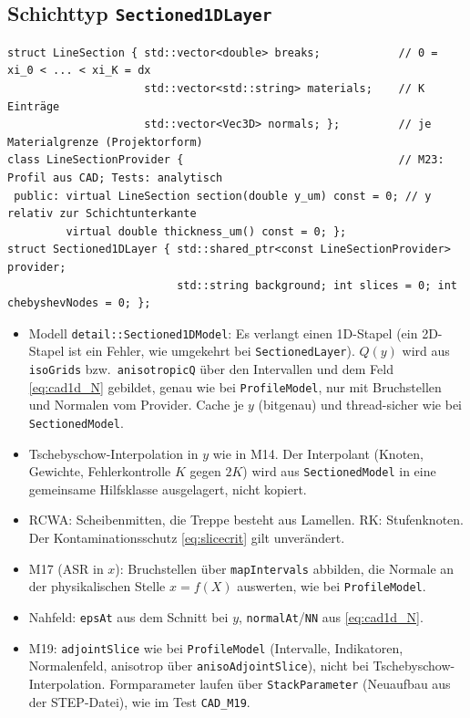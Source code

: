 \subsection{Schichttyp \texttt{Sectioned1DLayer}}
{\footnotesize\begin{verbatim}
struct LineSection { std::vector<double> breaks;            // 0 = xi_0 < ... < xi_K = dx
                     std::vector<std::string> materials;    // K Einträge
                     std::vector<Vec3D> normals; };         // je Materialgrenze (Projektorform)
class LineSectionProvider {                                 // M23: Profil aus CAD; Tests: analytisch
 public: virtual LineSection section(double y_um) const = 0; // y relativ zur Schichtunterkante
         virtual double thickness_um() const = 0; };
struct Sectioned1DLayer { std::shared_ptr<const LineSectionProvider> provider;
                          std::string background; int slices = 0; int chebyshevNodes = 0; };
\end{verbatim}}
\begin{itemize}[nosep]
  \item Modell \verb|detail::Sectioned1DModel|: Es verlangt einen 1D-Stapel (ein 2D-Stapel ist ein Fehler, wie
        umgekehrt bei \verb|SectionedLayer|). $Q(y)$ wird aus \verb|isoGrids| bzw.\ \verb|anisotropicQ| über den
        Intervallen und dem Feld \eqref{eq:cad1d_N} gebildet, genau wie bei \verb|ProfileModel|, nur mit Bruchstellen und
        Normalen vom Provider. Cache je $y$ (bitgenau) und thread-sicher wie bei \verb|SectionedModel|.
  \item Tschebyschow-Interpolation in $y$ wie in M14. Der Interpolant (Knoten, Gewichte, Fehlerkontrolle $K$ gegen $2K$)
        wird aus \verb|SectionedModel| in eine gemeinsame Hilfsklasse ausgelagert, nicht kopiert.
  \item RCWA: Scheibenmitten, die Treppe besteht aus Lamellen. RK: Stufenknoten. Der Kontaminationsschutz
        \eqref{eq:slicecrit} gilt unverändert.
  \item M17 (ASR in $x$): Bruchstellen über \verb|mapIntervals| abbilden, die Normale an der physikalischen Stelle
        $x=f(X)$ auswerten, wie bei \verb|ProfileModel|.
  \item Nahfeld: \verb|epsAt| aus dem Schnitt bei $y$, \verb|normalAt|/\verb|NN| aus \eqref{eq:cad1d_N}.
  \item M19: \verb|adjointSlice| wie bei \verb|ProfileModel| (Intervalle, Indikatoren, Normalenfeld, anisotrop über
        \verb|anisoAdjointSlice|), nicht bei Tschebyschow-Interpolation. Formparameter laufen über
        \verb|StackParameter| (Neuaufbau aus der STEP-Datei), wie im Test \verb|CAD_M19|.
\end{itemize}

